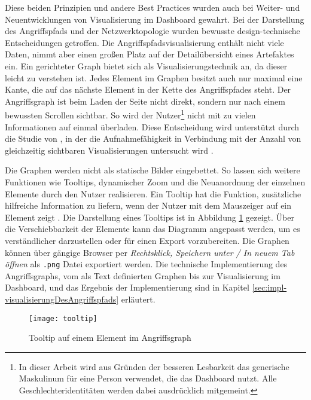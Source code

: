 %
\par Diese beiden Prinzipien und andere Best Practices wurden auch bei Weiter- und Neuentwicklungen von Visualisierung im Dashboard gewahrt. Bei der Darstellung des Angriffspfads und der Netzwerktopologie wurden bewusste design-technische Entscheidungen getroffen. Die Angriffspfadsvisualisierung enthält nicht viele Daten, nimmt aber einen großen Platz auf der Detailübersicht eines Artefaktes ein. Ein gerichteter Graph bietet sich als Visualisierungstechnik an, da dieser leicht zu verstehen ist. Jedes Element im Graphen besitzt auch nur maximal eine Kante, die auf das nächste Element in der Kette des Angriffspfades steht. Der Angriffsgraph ist beim Laden der Seite nicht direkt, sondern nur nach einem bewussten Scrollen sichtbar. So wird der Nutzer\footnote{In dieser Arbeit wird aus Gründen der besseren Lesbarkeit das generische Maskulinum für eine Person verwendet, die das Dashboard nutzt. Alle Geschlechteridentitäten werden dabei ausdrücklich mitgemeint.} nicht mit zu vielen Informationen auf einmal überladen. Diese Entscheidung wird unterstützt durch die Studie von \citeauthor{toreiniDESIGNINGUSERADAPTIVEINFORMATION}, in der die Aufnahmefähigkeit in Verbindung mit der Anzahl von gleichzeitig sichtbaren Visualisierungen untersucht wird \autocite{toreiniDESIGNINGUSERADAPTIVEINFORMATION}.
\par Die Graphen werden nicht als statische Bilder eingebettet. So lassen sich weitere Funktionen wie Tooltips, dynamischer Zoom und die Neuanordnung der einzelnen Elemente durch den Nutzer realisieren. Ein Tooltip hat die Funktion, zusätzliche hilfreiche Information zu liefern, wenn der Nutzer mit dem Mauszeiger auf ein Element zeigt \autocite{TooltipCarbonDesign}. Die Darstellung eines Tooltips ist in Abbildung \ref{fig:tooltip} gezeigt. Über die Verschiebbarkeit der Elemente kann das Diagramm angepasst werden, um es verständlicher darzustellen oder für einen Export vorzubereiten. Die Graphen können über gängige Browser per \textit{Rechtsklick, Speichern unter / In neuem Tab öffnen} als \verb|.png| Datei exportiert werden. Die technische Implementierung des Angriffsgraphs, vom als Text definierten Graphen bis zur Visualisierung im Dashboard, und das Ergebnis der Implementierung sind in Kapitel \ref{sec:impl-visualisierungDesAngriffspfads} erläutert.
%
\begin{figure}
    \centering
    \texttt{[image: tooltip]}
    \caption{Tooltip auf einem Element im Angriffsgraph}
    \label{fig:tooltip}
\end{figure}
%
